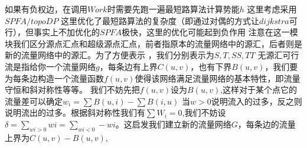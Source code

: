 {}
\markdownRendererSectionEnd \markdownRendererSectionBegin
{}\markdownRendererInterblockSeparator
{}\markdownRendererInterblockSeparator
{}
\markdownRendererSectionEnd \markdownRendererSectionBegin
{}\markdownRendererInterblockSeparator
{}\markdownRendererInterblockSeparator
{}
\markdownRendererSectionEnd 
\markdownRendererSectionEnd \markdownRendererSectionBegin
{}\markdownRendererInterblockSeparator
{}如果有负权边，在调用$ Work $时需要先跑一遍最短路算法计算势能$ h $\markdownRendererParagraphSeparator
{}这里考虑采用$ SPFA/topoDP $\markdownRendererParagraphSeparator
{}这里优化了最短路算法的复杂度（即通过对偶的方式让$ dijkstra $可行），但事实上不加优化的$ SPFA $极快，这里的优化可能起到负作用\markdownRendererInterblockSeparator
{}\markdownRendererSectionBegin
{}\markdownRendererInterblockSeparator
{}\markdownRendererInterblockSeparator
{}
\markdownRendererSectionEnd \markdownRendererSectionBegin
{}\markdownRendererInterblockSeparator
{}\markdownRendererInterblockSeparator
{}
\markdownRendererSectionEnd 
\markdownRendererSectionEnd \markdownRendererSectionBegin
{}\markdownRendererInterblockSeparator
{}注意在这一模块我们区分源点汇点和超级源点汇点，前者指原本的流量网络中的源汇，后者则是新的流量网络中的源汇。为了方便表示 ，我们分别表示为$ S,T,SS,TT $\markdownRendererInterblockSeparator
{}\markdownRendererSectionBegin
{}\markdownRendererInterblockSeparator
{}无源汇可行流是指给你一个流量网络$ g $，每条边有上界$ C(u,v) $，也有下界$ B(u,v) $，我们要为每条边构造一个流量函数$ f(u,v) $使得该网络满足流量网络的基本特性，即流量守恒和斜对称性等等。\markdownRendererParagraphSeparator
{}我们不妨先把$ f(u,v) $设为$ B(u,v) $,这样对于某个点它的流量差可以确定$ w_i=\sum B(u,i)-\sum B(i,u) $\markdownRendererParagraphSeparator
{}当$ w>0 $说明流入的过多，反之则说明流出的过多。根据斜对称性我们有$ \sum W_i=0 $,我们不妨设$ \delta =\sum_{wi>0} wi=\sum_{wi<0}-wi $。这启发我们建立新的流量网络$ G $，每条边的流量上界为$ C(u,v)-B(u,v) $,\markdownRendererParagraphSeparator
